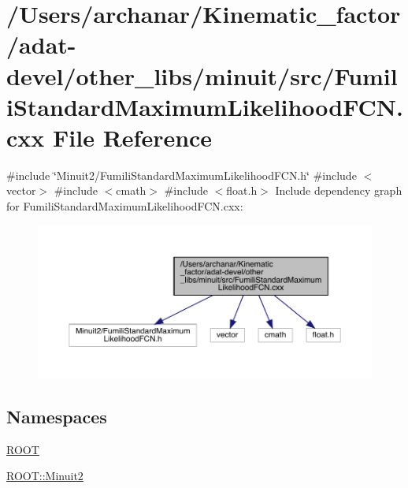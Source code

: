 \hypertarget{adat-devel_2other__libs_2minuit_2src_2FumiliStandardMaximumLikelihoodFCN_8cxx}{}\section{/\+Users/archanar/\+Kinematic\+\_\+factor/adat-\/devel/other\+\_\+libs/minuit/src/\+Fumili\+Standard\+Maximum\+Likelihood\+F\+CN.cxx File Reference}
\label{adat-devel_2other__libs_2minuit_2src_2FumiliStandardMaximumLikelihoodFCN_8cxx}
{\ttfamily \#include \char`\"{}Minuit2/\+Fumili\+Standard\+Maximum\+Likelihood\+F\+C\+N.\+h\char`\"{}}\newline
{\ttfamily \#include $<$vector$>$}\newline
{\ttfamily \#include $<$cmath$>$}\newline
{\ttfamily \#include $<$float.\+h$>$}\newline
Include dependency graph for Fumili\+Standard\+Maximum\+Likelihood\+F\+C\+N.\+cxx\+:
\nopagebreak
\begin{figure}[H]
\begin{center}
\leavevmode
\includegraphics[width=350pt]{db/dae/adat-devel_2other__libs_2minuit_2src_2FumiliStandardMaximumLikelihoodFCN_8cxx__incl}
\end{center}
\end{figure}
\subsection*{Namespaces}
\begin{DoxyCompactItemize}
\item 
 \mbox{\hyperlink{namespaceROOT}{R\+O\+OT}}
\item 
 \mbox{\hyperlink{namespaceROOT_1_1Minuit2}{R\+O\+O\+T\+::\+Minuit2}}
\end{DoxyCompactItemize}
